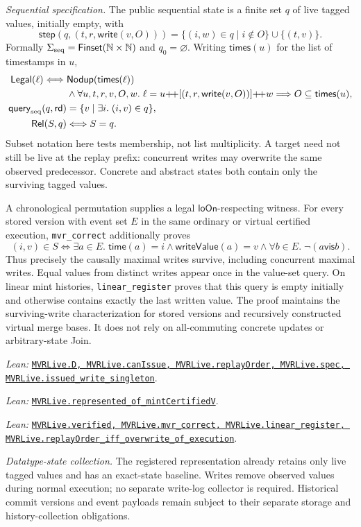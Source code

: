 \documentclass[11pt]{article}
\theoremstyle{definition}
\newcommand{\N}{\mathbb N}
\newcommand{\vis}{\mathrel{\mathsf{vis}}}
\newcommand{\loOn}{\mathsf{loOn}}
\newcommand{\lean}[1]{\texttt{#1}}
\newcommand{\src}[2]{\href{../../#1}{\texttt{#2}}}
\newcommand{\anchor}[2]{\par\smallskip\noindent\emph{Lean: }\src{#1}{#2}.}
\begin{document}
\emph{Sequential specification.} The public sequential state is a finite set $q$ of live tagged values, initially
empty, with
\[
 \mathsf{step}(q,(t,r,\mathsf{write}(v,O)))
   =\{(i,w)\in q\mid i\notin O\}\cup\{(t,v)\}.
\]
Formally $\Sigma_{\rm seq}=\mathsf{Finset}(\N\times\N)$ and $q_0=\varnothing$.
Writing $\mathsf{times}(u)$ for the list of timestamps in $u$,
\[
\begin{aligned}
 \mathsf{Legal}(\ell)\Longleftrightarrow{}&
 \mathsf{Nodup}(\mathsf{times}(\ell))\\
 &\land\forall u,t,r,v,O,w.\;
 \ell=u{+\!+}[(t,r,\mathsf{write}(v,O))]{+\!+}w
 \Longrightarrow O\subseteq\mathsf{times}(u),\\
 \mathsf{query}_{\rm seq}(q,\mathsf{rd})&=\{v\mid\exists i.\;(i,v)\in q\},\\
 \mathsf{Rel}(S,q)&\Longleftrightarrow S=q.
\end{aligned}
\]
Subset notation here tests membership, not list multiplicity.
A target need not still be live at the replay prefix:
concurrent writes may overwrite the same observed predecessor. Concrete and
abstract states both contain only the surviving tagged values.

A chronological permutation supplies a legal $\loOn$-respecting witness.
For every stored version with event set $E$ in the same ordinary or virtual
certified execution, \lean{mvr\_correct} additionally proves
\[
 (i,v)\in S\Longleftrightarrow
 \exists a\in E.\;\mathsf{time}(a)=i\land\mathsf{writeValue}(a)=v
   \land\forall b\in E.\;\neg(a\vis b).
\]
Thus precisely the causally maximal writes survive, including concurrent
maximal writes. Equal values from distinct writes appear once in the value-set
query. On linear mint histories, \lean{linear\_register} proves that this query
is empty initially and otherwise contains exactly the last written value.
The proof maintains the surviving-write characterization for stored versions
and recursively constructed virtual merge bases. It does not rely on
all-commuting concrete updates or arbitrary-state Join.
\anchor{Sal/MRDTs/Instances/MVRLive.lean}
  {MVRLive.D, MVRLive.canIssue, MVRLive.replayOrder, MVRLive.spec,
   MVRLive.issued\_write\_singleton}
\anchor{Sal/MRDTs/Instances/MVRLiveCertified.lean}
  {MVRLive.represented\_of\_mintCertifiedV}
\anchor{Sal/MRDTs/Instances/MVRLiveContract.lean}
  {MVRLive.verified, MVRLive.mvr\_correct,
   MVRLive.linear\_register, MVRLive.replayOrder\_iff\_overwrite\_of\_execution}

\emph{Datatype-state collection.} The registered representation already retains
only live tagged values and has an exact-state baseline. Writes remove observed
values during normal execution; no separate write-log collector is required.
Historical commit versions and event payloads remain subject to their separate
storage and history-collection obligations.
\end{document}
